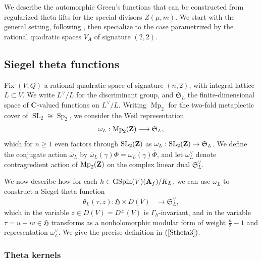 \documentclass{amsart}
\theoremstyle{definition}
\theoremstyle{definition}
\theoremstyle{definition}
\begin{document}
We describe the automorphic Green's functions that can be constructed from regularized theta lifts for the special divisors $Z(\mu, m)$. 
We start with the general setting, following \cite{AGHMP, KuBF, Br-123, BY, VO}, then specialize to the case parametrized by the rational quadratic spaces $V_A$ of signature $(2,2)$.

\subsection{Siegel theta functions}

Fix $(V, Q)$ a rational quadratic space of signature $(n, 2)$, with integral lattice $L \subset V$.
We write $L^{\vee}/L$ for the discriminant group, and $\mathfrak{S}_L$ the finite-dimensional 
space of {\bf{C}}-valued functions on $L^{\vee}/L$. Writing $\operatorname{Mp}_2$
for the two-fold metaplectic cover of $\operatorname{SL}_2 \cong \operatorname{Sp}_2$, we consider the Weil representation
\begin{align*} \omega_L: \operatorname{Mp}_2({\bf{Z}}) \longrightarrow \mathfrak{S}_L, \end{align*} 
which for $n \geq 1$ even factors through $\operatorname{SL}_2({\bf{Z}})$ as 
$\omega_L: \operatorname{SL}_2({\bf{Z}}) \rightarrow \mathfrak{S}_L$. 
We define the conjugate action $\overline{\omega}_L$ by 
$\overline{\omega}_L (\gamma) \Phi = \overline{\omega_L(\gamma) \overline{\Phi}}$, and let $\omega_L^{\vee}$ denote
contragredient action of $\operatorname{Mp}_2({\bf{Z}})$ on the complex linear dual $\mathfrak{S}_L^{\vee}$.

We now describe how for each $h \in \operatorname{GSpin}(V)({\bf{A}}_f)/K_L$, we can use $\omega_L$ to construct a Siegel theta function
\begin{align*} \theta_L(\tau, z) : \mathfrak{H} \times D(V) &\longrightarrow \mathfrak{S}_L^{\vee},\end{align*}
which in the variable $z \in D(V) = D^{\pm}(V)$ is $\Gamma_h$-invariant, and in the variable $\tau = u + i v \in \mathfrak{H}$
transforms as a nonholomorphic modular form of weight $\frac{n}{2}-1$ and representation $\omega_L^{\vee}$. We give 
the precise definition in $(\ref{Stheta3})$.

\subsubsection{Theta kernels}
\end{document}
